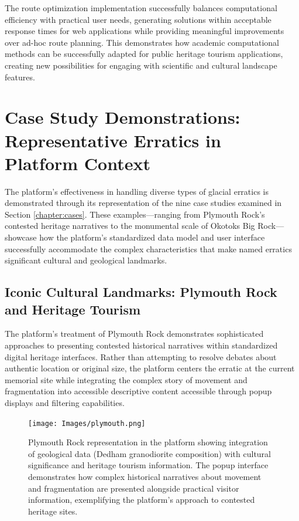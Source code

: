 The route optimization implementation successfully balances computational efficiency with practical user needs, generating solutions within acceptable response times for web applications while providing meaningful improvements over ad-hoc route planning. This demonstrates how academic computational methods can be successfully adapted for public heritage tourism applications, creating new possibilities for engaging with scientific and cultural landscape features.

\section{Case Study Demonstrations: Representative Erratics in Platform Context}
\label{sec:case_study_demonstrations}

The platform's effectiveness in handling diverse types of glacial erratics is demonstrated through its representation of the nine case studies examined in Section \ref{chapter:cases}. These examples—ranging from Plymouth Rock's contested heritage narratives to the monumental scale of Okotoks Big Rock—showcase how the platform's standardized data model and user interface successfully accommodate the complex characteristics that make named erratics significant cultural and geological landmarks.

\subsection{Iconic Cultural Landmarks: Plymouth Rock and Heritage Tourism}
\label{subsec:iconic_landmarks}

The platform's treatment of Plymouth Rock demonstrates sophisticated approaches to presenting contested historical narratives within standardized digital heritage interfaces. Rather than attempting to resolve debates about authentic location or original size, the platform centers the erratic at the current memorial site while integrating the complex story of movement and fragmentation into accessible descriptive content accessible through popup displays and filtering capabilities.

\begin{figure}[htbp]
    \centering
    \texttt{[image: Images/plymouth.png]}
    \caption{Plymouth Rock representation in the platform showing integration of geological data (Dedham granodiorite composition) with cultural significance and heritage tourism information. The popup interface demonstrates how complex historical narratives about movement and fragmentation are presented alongside practical visitor information, exemplifying the platform's approach to contested heritage sites.}
    \label{fig:plymouth_rock_detail}
\end{figure}

